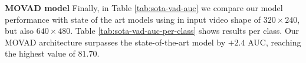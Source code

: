 \noindent\textbf{MOVAD model}
Finally, in Table \ref{tab:sota-vad-auc} we compare our model performance with state of the art models using in input video shape of $320\times240$, but also $640\times480$.
Table \ref{tab:sota-vad-auc-per-class} shows results per class.
Our MOVAD architecture surpasses the state-of-the-art model by $+2.4$ AUC, reaching the highest value of $81.70$.

